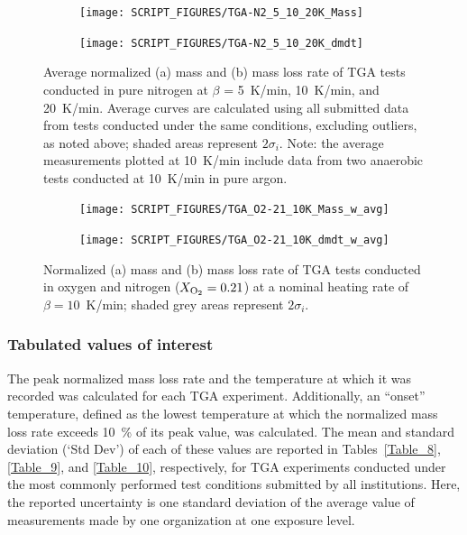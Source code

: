 \documentclass{book}
\begin{document}
\begin{figure}[p]
\centering
\begin{subfigure}[b]{0.9\textwidth}
   \texttt{[image: SCRIPT\_FIGURES/TGA-N2\_5\_10\_20K\_Mass]}
   \caption{}
   \label{Fig:TGA-N2_5_10_20K_Mass}
\end{subfigure}

\begin{subfigure}[b]{0.9\textwidth}
   \texttt{[image: SCRIPT\_FIGURES/TGA-N2\_5\_10\_20K\_dmdt]}
   \caption{}
   \label{Fig:TGA-N2_5_10_20K_dmdt}
\end{subfigure}

  \caption{Average normalized (a) mass and (b) mass loss rate of TGA tests conducted in pure nitrogen at $\beta$ = 5~K/min, 10~K/min, and 20~K/min. Average curves are calculated using all submitted data from tests conducted under the same conditions, excluding outliers, as noted above; shaded areas represent $2\sigma_i$. Note: the average measurements plotted at 10~K/min include data from two anaerobic tests conducted at 10~K/min in pure argon.}
  \label{Fig:TGA-N2_5_10_20K}
\end{figure}


\begin{figure}[p]
\centering
\begin{subfigure}[b]{0.9\textwidth}
   \texttt{[image: SCRIPT\_FIGURES/TGA\_O2-21\_10K\_Mass\_w\_avg]}
   \caption{}
   \label{Fig:TGA_O2-21_10KMass_w_avg}
\end{subfigure}

\begin{subfigure}[b]{0.9\textwidth}
   \texttt{[image: SCRIPT\_FIGURES/TGA\_O2-21\_10K\_dmdt\_w\_avg]}
   \caption{}
   \label{Fig:TGA_O2-21_10Kdmdt_w_avg}
\end{subfigure}

  \caption{Normalized (a) mass and (b) mass loss rate of TGA tests conducted in oxygen and nitrogen ($X_{\rm O_2}=0.21$) at a nominal heating rate of $\beta=10$~K/min; shaded grey areas represent $2\sigma_i$.}
  \label{Fig:TGA_O2-21_10K_w_avg}
\end{figure}

\newpage
\subsubsection{Tabulated values of interest}

The peak normalized mass loss rate and the temperature at which it was recorded was calculated for each TGA experiment. Additionally, an ``onset'' temperature, defined as the lowest temperature at which the normalized mass loss rate exceeds 10~\% of its peak value, was calculated. The mean and standard deviation (`Std Dev') of each of these values are reported in Tables~\ref{Table_8}, \ref{Table_9}, and \ref{Table_10}, respectively, for TGA experiments conducted under the most commonly performed test conditions submitted by all institutions. Here, the reported uncertainty is one standard deviation of the average value of measurements made by one organization at one exposure level.
\end{document}
